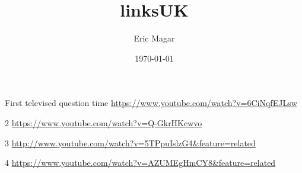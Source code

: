 \documentclass{article}
\author{Eric Magar}
\date{\today}
\title{linksUK}
\begin{document}
\maketitle
\tableofcontents

First televised question time \url{https://www.youtube.com/watch?v=6CiNqfEJLsw}

2 \url{https://www.youtube.com/watch?v=Q-GkrHKcwvo}

3 \url{http://www.youtube.com/watch?v=5TPpuIslzG4&feature=related}

4 \url{https://www.youtube.com/watch?v=AZUMEgHmCY8&feature=related}
\end{document}
